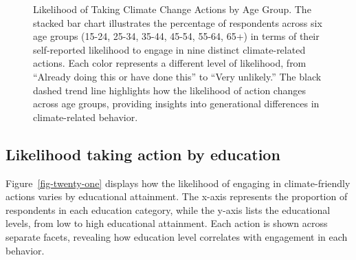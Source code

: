 \documentclass[
  letterpaper,
  DIV=11,
  numbers=noendperiod]{scrartcl}
\begin{document}
\begin{figure}


\caption{\label{fig-twenty}Likelihood of Taking Climate Change Actions
by Age Group. The stacked bar chart illustrates the percentage of
respondents across six age groups (15-24, 25-34, 35-44, 45-54, 55-64,
65+) in terms of their self-reported likelihood to engage in nine
distinct climate-related actions. Each color represents a different
level of likelihood, from ``Already doing this or have done this'' to
``Very unlikely.'' The black dashed trend line highlights how the
likelihood of action changes across age groups, providing insights into
generational differences in climate-related behavior.}

\end{figure}%

\subsection{Likelihood taking action by
education}\label{likelihood-taking-action-by-education}

Figure~\ref{fig-twenty-one} displays how the likelihood of engaging in
climate-friendly actions varies by educational attainment. The x-axis
represents the proportion of respondents in each education category,
while the y-axis lists the educational levels, from low to high
educational attainment. Each action is shown across separate facets,
revealing how education level correlates with engagement in each
behavior.
\end{document}
